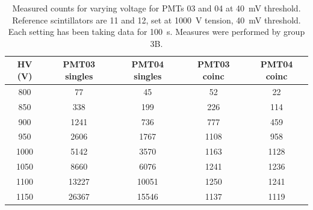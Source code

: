 \documentclass[../main.tex]{subfiles}
\begin{document}
        \FloatBarrier
        \begin{table}[t!]
            \centering
            \caption{Measured counts for varying voltage for PMTs 03 and 04 at \SI{40}{\milli \volt} threshold. Reference scintillators are 11 and 12, set at \SI{1000}{\volt} tension, \SI{40}{\milli \volt} threshold. Each setting has been taking data for \SI{100}{\second}. Measures were performed by group 3B.}
            \label{tab:HV3B}
                \begin{tabular}{|c|cc|cc|}
                    \hline
                    HV (V) & PMT03 singles & PMT04 singles & PMT03 coinc & PMT04 coinc \\ \hline
                    \phantom{0}800 & \phantom{000}77 & \phantom{000}45 & \phantom{00}52 & \phantom{00}22 \\
                    \phantom{0}850 & \phantom{00}338 & \phantom{00}199 & \phantom{0}226 & \phantom{0}114 \\
                    \phantom{0}900 & \phantom{0}1241 & \phantom{00}736 & \phantom{0}777 & \phantom{0}459 \\
                    \phantom{0}950 & \phantom{0}2606 & \phantom{0}1767 & 1108           & \phantom{0}958 \\
                    1000           & \phantom{0}5142 & \phantom{0}3570 & 1163           & 1128        \\
                    1050           & \phantom{0}8660 & \phantom{0}6076 & 1241           & 1236        \\
                    1100           & 13227           & 10051           & 1250           & 1241        \\
                    1150           & 26367           & 15546           & 1137           & 1119        \\ \hline
                \end{tabular}
        \end{table}
\end{document}

